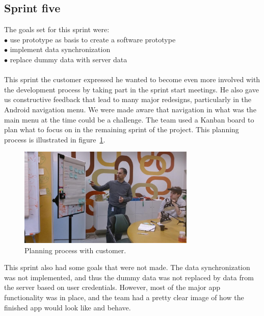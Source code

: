 \subsection{Sprint five}
The goals set for this sprint were:\\
$\bullet$\hspace{0.25cm} use prototype as basis to create a software prototype\\
$\bullet$\hspace{0.25cm} implement data synchronization\\
$\bullet$\hspace{0.25cm} replace dummy data with server data\\\\
This sprint the customer expressed he wanted to become even more involved with the development process by taking part in the sprint start meetings.
He also gave us constructive feedback that lead to many major redesigns, particularly in the Android navigation menu. We were made aware that navigation in what was the main menu at the time could be a challenge. The team used a Kanban board to plan what to focus on in the remaining sprint of the project. This planning process is illustrated in figure~\ref{fig:kanban}.

\begin{figure}[htp]
\centering
\includegraphics[width=0.75\textwidth, clip, trim=5cm 0cm 0cm 0cm]{ch/devProcess/fig/kanban.jpg}
\caption{Planning process with customer.}
\label{fig:kanban}
\end{figure}

\noindent This sprint also had some goals that were not made. The data synchronization was not implemented, and thus the dummy data was not replaced by data from the server based on user credentials. However, most of the major app functionality was in place, and the team had a pretty clear image of how the finished app would look like and behave.

